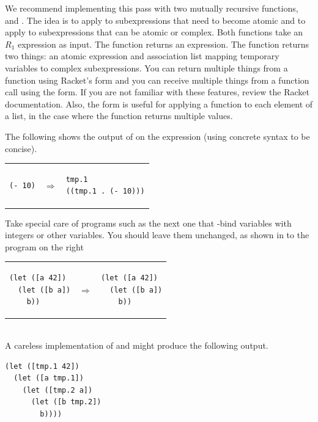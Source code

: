 \documentclass[11pt]{book}
\begin{document}
We recommend implementing this pass with two mutually recursive
functions,  and . The idea is to apply
 to subexpressions that need to become atomic and to
apply  to subexpressions that can be atomic or complex.
Both functions take an $R_1$ expression as input.  The 
function returns an expression.  The  function returns
two things: an atomic expression and association list mapping
temporary variables to complex subexpressions. You can return multiple
things from a function using Racket's  form and you can
receive multiple things from a function call using the
 form. If you are not familiar with these features,
review the Racket documentation.  Also, the  form is
useful for applying a function to each element of a list, in the case
where the function returns multiple values.

The following shows the output of  on the expression
 (using concrete syntax to be concise).

\begin{tabular}{lll}
\begin{minipage}{0.4\textwidth}
\begin{lstlisting}
(- 10)
\end{lstlisting}
\end{minipage}
&
$\Rightarrow$
&
\begin{minipage}{0.4\textwidth}
\begin{lstlisting}
tmp.1
((tmp.1 . (- 10)))
\end{lstlisting}
\end{minipage}
\end{tabular}

Take special care of programs such as the next one that -bind
variables with integers or other variables. You should leave them
unchanged, as shown in to the program on the right \\
\begin{tabular}{lll}
\begin{minipage}{0.4\textwidth}
\begin{lstlisting}
(let ([a 42])
  (let ([b a])
    b))
\end{lstlisting}
\end{minipage}
&
$\Rightarrow$
&
\begin{minipage}{0.4\textwidth}
\begin{lstlisting}
(let ([a 42])
  (let ([b a])
    b))
\end{lstlisting}
\end{minipage}
\end{tabular} \\
A careless implementation of  and  might
produce the following output.\\
\begin{minipage}{0.4\textwidth}
\begin{lstlisting}
(let ([tmp.1 42])
  (let ([a tmp.1])
    (let ([tmp.2 a])
      (let ([b tmp.2])
        b))))
\end{lstlisting}
\end{minipage}
\end{document}
